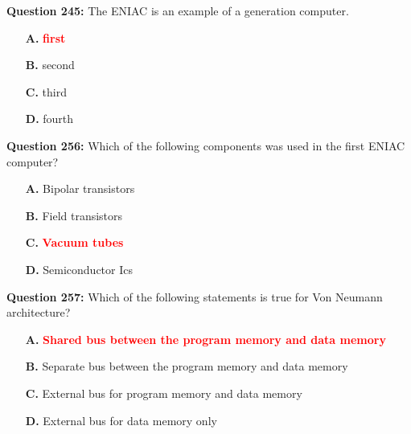 \documentclass[12pt,a4paper]{article}
\begin{document}
\vspace{0.5cm}

\vspace{0.5cm}

\textbf{Question 245:} The ENIAC is an example of a \underline{\hspace{1.5cm}} generation computer.

\begin{itemize}
    \item[\textbf{A.}] \textcolor{red}{\textbf{first}}
    \item[\textbf{B.}] second
    \item[\textbf{C.}] third
    \item[\textbf{D.}] fourth
\end{itemize}

\vspace{0.5cm}

\vspace{0.5cm}

\textbf{Question 256:} Which of the following components was used in the first ENIAC computer?

\begin{itemize}
    \item[\textbf{A.}] Bipolar transistors
    \item[\textbf{B.}] Field transistors
    \item[\textbf{C.}] \textcolor{red}{\textbf{Vacuum tubes}}
    \item[\textbf{D.}] Semiconductor Ics
\end{itemize}

\vspace{0.5cm}

\vspace{0.5cm}

\textbf{Question 257:} Which of the following statements is true for Von Neumann architecture?

\begin{itemize}
    \item[\textbf{A.}] \textcolor{red}{\textbf{Shared bus between the program memory and data memory}}
    \item[\textbf{B.}] Separate bus between the program memory and data memory
    \item[\textbf{C.}] External bus for program memory and data memory
    \item[\textbf{D.}] External bus for data memory only
\end{itemize}
\end{document}
